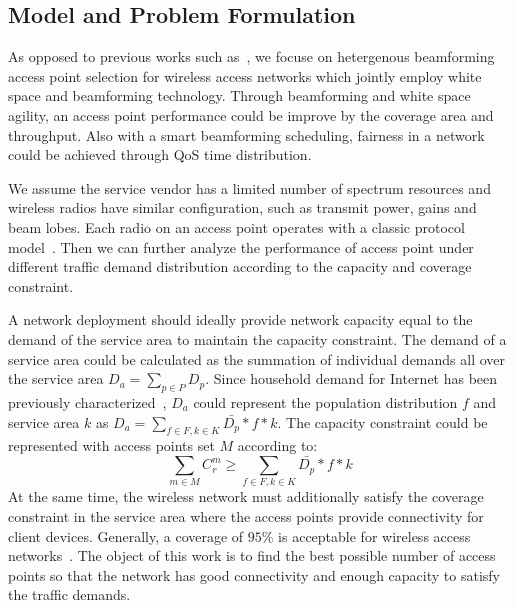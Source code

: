 \subsection{Model and Problem Formulation}
\label{subsec:problem}

As opposed to previous works such as~\cite{franklin2007node,robinson2010deploying
,si2010overview}, we focuse on hetergenous beamforming access point selection 
for wireless access networks which jointly employ white space and beamforming technology.
Through beamforming and white space agility, an access point performance could be
improve by the coverage area and throughput. Also with a smart beamforming scheduling, 
fairness in a network could be achieved through QoS time distribution.


We assume the service vendor has a limited number of spectrum resources and 
wireless radios have similar configuration, such as transmit power, gains and beam lobes. 
Each radio on an access point operates with a classic protocol model~\cite{gupta2000capacity}. 
Then we can further analyze the performance of access point under different 
traffic demand distribution according to the capacity 
and coverage constraint.

A network deployment should ideally provide network capacity equal to the demand of the service 
area to maintain the capacity constraint. The demand of a service area could be calculated as the 
summation of individual demands all over the service area $D_a=\sum_{p\in P}D_p$. Since 
household demand for Internet has been previously characterized~\cite{rosston2011household}, 
$D_a$ could represent the population distribution $f$ and service area $k$ as 
$D_a=\sum_{f \in F,k \in K}\bar{D_p}*f*k$. 
The capacity constraint could be represented with access points set $M$ according to:
\begin{equation}
\label{eq:nlbound}
\sum_{m \in M}C_r^m \ge \sum_{f \in F,k \in K}\bar{D_p}*f*k
\end{equation}
At the same time, the wireless network must additionally satisfy the coverage constraint in the service 
area where the access points provide connectivity for client devices. 
Generally, a coverage of $95\%$ is acceptable for wireless access networks~\cite{robinson2010deploying}.
The object of this work is to find the best possible number of access points so that the network has good 
connectivity and enough capacity to satisfy the traffic demands.

